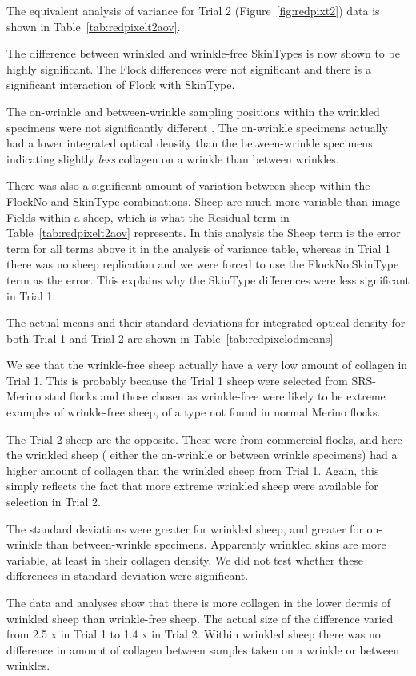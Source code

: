 \documentclass[titlepage]{article}  %
\begin{document}
The equivalent analysis of variance for Trial 2 (Figure~\ref{fig:redpixt2}) data is shown in Table~\ref{tab:redpixelt2aov}.

The difference between wrinkled and wrinkle-free SkinTypes is now shown to be highly significant. The Flock differences were not significant and there is a significant interaction of Flock with SkinType.  

 The on-wrinkle and between-wrinkle sampling positions within the wrinkled specimens were not significantly different . The on-wrinkle specimens actually had a lower integrated optical density than the between-wrinkle specimens indicating slightly {\em less} collagen on a wrinkle than between wrinkles.

There was also a significant amount of variation between sheep within the FlockNo and SkinType combinations. Sheep are much more variable than image Fields within a sheep, which is what the Residual term in Table~\ref{tab:redpixelt2aov} represents. In this analysis the Sheep term is the error term for all terms above it in the analysis of variance table, whereas in Trial 1 there was no sheep replication and we were forced to use the FlockNo:SkinType term as the error. This explains why the SkinType differences were less significant in Trial 1. 

The actual means and their standard deviations for integrated optical density for both Trial 1 and Trial 2 are shown in Table~\ref{tab:redpixelodmeans}

We see that the wrinkle-free sheep actually have a very low amount of collagen in Trial 1. This is probably because the Trial 1 sheep were selected from SRS-Merino stud flocks and those chosen as wrinkle-free were likely to be extreme examples of wrinkle-free sheep, of a type not found in normal Merino flocks. 

The Trial 2 sheep are the opposite. These were from commercial flocks, and here the wrinkled sheep ( either the on-wrinkle or between wrinkle specimens) had a higher amount of collagen than the wrinkled sheep from Trial 1. Again, this simply reflects the fact that more extreme wrinkled sheep were available for selection in Trial 2. 

The standard deviations were greater for wrinkled sheep, and greater for on-wrinkle than between-wrinkle specimens. Apparently wrinkled skins are more variable, at least in their collagen density. We did not test whether these differences in standard deviation were significant.

The data and analyses show that there is more collagen in the lower dermis of wrinkled sheep than wrinkle-free sheep.  The actual size of the difference varied from 2.5 x in Trial 1 to 1.4 x in Trial 2. 
Within wrinkled sheep there was no difference in amount of collagen between samples taken on a wrinkle or between wrinkles.
\end{document}
